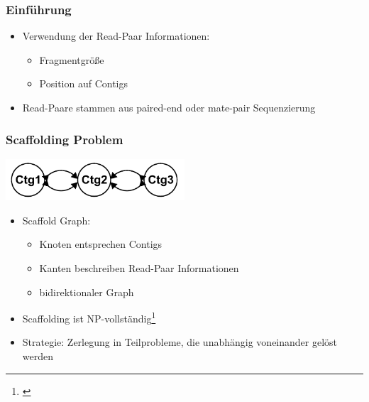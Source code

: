 \documentclass[xcolor=pst]{beamer}
\begin{document}
\begin{frame}
  \frametitle{Einführung}
  \begin{itemize}
  \item Verwendung der Read-Paar Informationen:
    \begin{itemize}
    \item Fragmentgröße
    \item Position auf Contigs
    \end{itemize}
  \item Read-Paare stammen aus paired-end oder mate-pair Sequenzierung
  \end{itemize}
\end{frame}

\begin{frame}
  \frametitle{Scaffolding Problem}
  \begin{center}
    \includegraphics[width=0.5\textwidth,height=0.8\textheight,keepaspectratio]{figures/Scaffolding_3.pdf}
  \end{center}
  \begin{itemize}
  \item Scaffold Graph:
    \begin{itemize}
    \item Knoten entsprechen Contigs
    \item Kanten beschreiben Read-Paar
      Informationen
    \item bidirektionaler Graph
    \end{itemize}
  \item Scaffolding ist NP-vollständig\footnote{\cite{Huson:2002kf}}
  \item Strategie: Zerlegung in %
    Teilprobleme, die unabhängig voneinander gelöst werden
  \end{itemize}
\end{frame}
\end{document}

